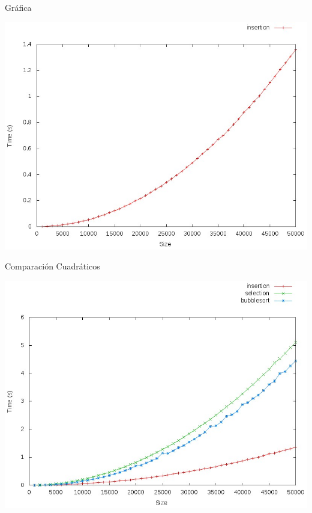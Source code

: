 \documentclass[compress]{beamer}
\begin{document}
\begin{frame}{Gráfica}
	\begin{alertblock}{}
		\begin{center}
		\includegraphics[scale=0.40]{images/insertion.jpeg}
		\end{center}
	\end{alertblock}
\end{frame}

\begin{frame}{Comparación Cuadráticos}
	\begin{alertblock}{}
		\begin{center}
		\includegraphics[scale=0.40]{images/slow.jpeg}
		\end{center}
	\end{alertblock}
\end{frame}
\end{document}
